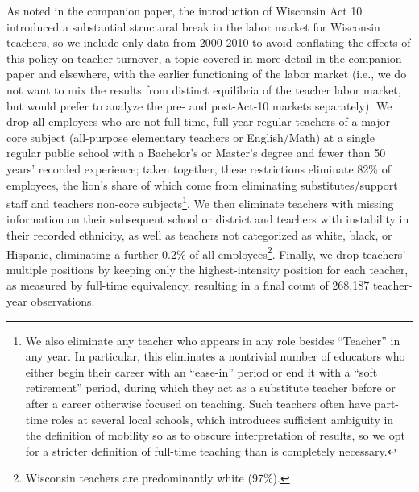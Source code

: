 \documentclass[]{article}
\let\rmarkdownfootnote\footnote%
\def\footnote{\protect\rmarkdownfootnote}
\begin{document}
As noted in the companion paper, the introduction of Wisconsin Act 10
introduced a substantial structural break in the labor market for
Wisconsin teachers, so we include only data from 2000-2010 to avoid
conflating the effects of this policy on teacher turnover, a topic
covered in more detail in the companion paper and elsewhere, with the
earlier functioning of the labor market (i.e., we do not want to mix the
results from distinct equilibria of the teacher labor market, but would
prefer to analyze the pre- and post-Act-10 markets separately). We drop
all employees who are not full-time, full-year regular teachers of a
major core subject (all-purpose elementary teachers or English/Math) at
a single regular public school with a Bachelor's or Master's degree and
fewer than 50 years' recorded experience; taken together, these
restrictions eliminate 82\% of employees, the lion's share of which come
from eliminating substitutes/support staff and teachers non-core
subjects\footnote{We also eliminate any teacher who appears in any role
  besides ``Teacher'' in any year. In particular, this eliminates a
  nontrivial number of educators who either begin their career with an
  ``ease-in'' period or end it with a ``soft retirement'' period, during
  which they act as a substitute teacher before or after a career
  otherwise focused on teaching. Such teachers often have part-time
  roles at several local schools, which introduces sufficient ambiguity
  in the definition of mobility so as to obscure interpretation of
  results, so we opt for a stricter definition of full-time teaching
  than is completely necessary.}. We then eliminate teachers with
missing information on their subsequent school or district and teachers
with instability in their recorded ethnicity, as well as teachers not
categorized as white, black, or Hispanic, eliminating a further 0.2\% of
all employees\footnote{Wisconsin teachers are predominantly white
  (97\%).}. Finally, we drop teachers' multiple positions by keeping
only the highest-intensity position for each teacher, as measured by
full-time equivalency, resulting in a final count of 268,187
teacher-year observations.
\end{document}
